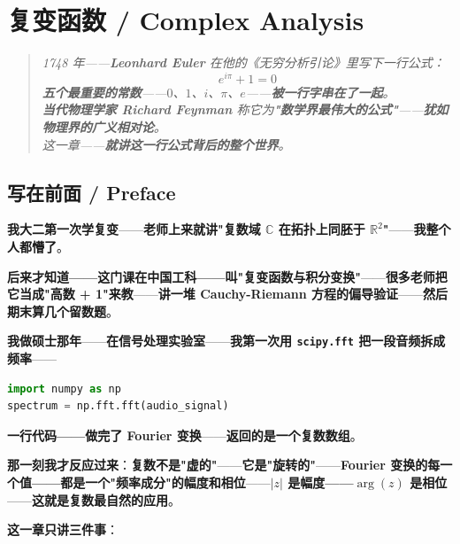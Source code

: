 
\chapter{复变函数 / Complex Analysis}
\label{ch:complex}

\begin{quote}\itshape
1748 年——\textbf{Leonhard Euler} 在他的《无穷分析引论》里写下一行公式：
\[
e^{i\pi} + 1 = 0
\]
\textbf{五个最重要的常数}——$0$、$1$、$i$、$\pi$、$e$——\textbf{被一行字串在了一起}。\\
\textbf{当代物理学家 Richard Feynman} 称它为\textbf{"数学界最伟大的公式"}——\textbf{犹如物理界的广义相对论}。\\
这一章——\textbf{就讲这一行公式背后的整个世界}。
\end{quote}

\section{写在前面 / Preface}

\textbf{我大二第一次学复变}——\textbf{老师上来就讲"复数域 $\mathbb{C}$ 在拓扑上同胚于 $\mathbb{R}^2$"}——\textbf{我整个人都懵了}。

\textbf{后来才知道——这门课在中国工科——叫"复变函数与积分变换"}——\textbf{很多老师把它当成"高数 + 1"来教}——\textbf{讲一堆 Cauchy-Riemann 方程的偏导验证}——\textbf{然后期末算几个留数题}。

\textbf{我做硕士那年}——\textbf{在信号处理实验室}——\textbf{我第一次用 \texttt{scipy.fft} 把一段音频拆成频率}——

\begin{lstlisting}[language=Python]
import numpy as np
spectrum = np.fft.fft(audio_signal)
\end{lstlisting}

\textbf{一行代码——做完了 Fourier 变换}——\textbf{返回的是一个复数数组}。

\textbf{那一刻我才反应过来}：\textbf{复数不是"虚的"}——\textbf{它是"旋转的"}——\textbf{Fourier 变换的每一个值——都是一个"频率成分"的\textbf{幅度}和\textbf{相位}}——\textbf{$|z|$ 是幅度——$\arg(z)$ 是相位}——\textbf{这就是复数最自然的应用}。

\textbf{这一章只讲三件事}：


